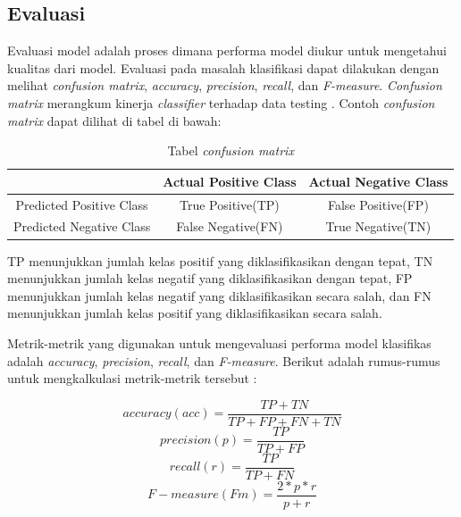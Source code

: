 \documentclass{article}
\begin{document}
   	\subsection{Evaluasi}
   	Evaluasi model adalah proses dimana performa model diukur untuk mengetahui kualitas dari model. Evaluasi pada masalah klasifikasi dapat dilakukan dengan melihat \textit{confusion matrix}, \textit{accuracy}, \textit{precision}, \textit{recall}, dan \textit{F-measure}. \textit{Confusion matrix} merangkum kinerja \textit{classifier} terhadap data testing \cite{hossin}. Contoh \textit{confusion matrix} dapat dilihat di tabel di bawah:
   	
   	\begin{table}[H]
   	\begin{center}
   		\begin{tabular}{|c|c|c|}
   			\hline
   			& Actual Positive Class & Actual Negative Class \\
   			\hline
   			Predicted Positive Class & True Positive(TP) & False Positive(FP) \\
   			\hline
   			Predicted Negative Class & False Negative(FN) & True Negative(TN) \\
   			\hline
   		\end{tabular}
   		\caption{Tabel \textit{confusion matrix}}
   	\end{center}
	\end{table}
   	\par
   	TP menunjukkan jumlah kelas positif yang diklasifikasikan dengan tepat, TN menunjukkan jumlah kelas negatif yang diklasifikasikan dengan tepat, FP menunjukkan jumlah kelas negatif yang diklasifikasikan secara salah, dan FN menunjukkan jumlah kelas positif yang diklasifikasikan secara salah.
   	\par
   	Metrik-metrik yang digunakan untuk mengevaluasi performa model klasifikas adalah \textit{accuracy}, \textit{precision}, \textit{recall}, dan \textit{F-measure}. Berikut adalah rumus-rumus untuk mengkalkulasi metrik-metrik tersebut :
   	
   	\begin{equation}
   		accuracy(acc) = \frac{TP + TN}{TP + FP + FN + TN}
   	\end{equation}
   	\begin{equation}
   		precision(p) = \frac{TP}{TP + FP}
   	\end{equation}
   	\begin{equation}
   		recall(r) = \frac{TP}{TP + FN}
   	\end{equation}
   	\begin{equation}
   		F-measure(Fm) = \frac{2 * p * r}{p + r}
   	\end{equation}
   \newpage
\end{document}
